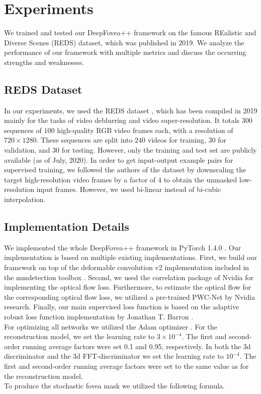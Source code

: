 \documentclass[10pt,twocolumn,letterpaper]{article}
\begin{document}
	\section{Experiments} \label{sec:experiments}
	We trained and tested our DeepFovea++ framework on the famous REalistic and Diverse Scenes (REDS) dataset, which was published in 2019. We analyze the performance of our framework with multiple metrics and discuss the occurring strengths and weaknesses.
	
	\subsection{REDS Dataset} \label{subsec:redsdataset}
	In our experiments, we used the REDS dataset \cite{REDS}, which has been compiled in 2019 mainly for the tasks of video deblurring and video super-resolution. It totals $300$ sequences of $100$ high-quality RGB video frames each, with a resolution of $720\times 1280$. These sequences are split into $240$ videos for training, $30$ for validation, and $30$ for testing. However, only the training and test set are publicly available (as of July, 2020). In order to get input-output example pairs for supervised training, we followed the authors of the dataset by downscaling the target high-resolution video frames by a factor of $4$ to obtain the unmasked low-resolution input frames. However, we used bi-linear instead of bi-cubic interpolation. \cite{REDS}
	
	
	\subsection{Implementation Details} \label{subsec:implementationdetails}
	We implemented the whole DeepFovea++ framework in PyTorch 1.4.0 \cite{pytorch}. Our implementation is based on multiple existing implementations. First, we build our framework on top of the deformable convolution v2 \cite{deformableconv} implementation included in the mmdetection toolbox \cite{mmdetection}. Second, we used the correlation package \cite{flownet2} of Nvidia for implementing the optical flow loss. Furthermore, to estimate the optical flow for the corresponding optical flow loss, we utilized a pre-trained PWC-Net \cite{pwcnet} by Nvidia research. Finally, our main supervised loss function is based on the adaptive robust loss function implementation by Jonathan T. Barron \cite{adaptiveroubustloss}.\\
	
	For optimizing all networks we utilized the Adam optimizer \cite{adam}. For the reconstruction model, we set the learning rate to $3\times 10^{-4}$. The first and second-order running average factors were set 0.1 and 0.95, respectively. In both the 3d discriminator and the 3d FFT-discriminator we set the learning rate to $10^{-4}$. The first and second-order running average factors were set to the same value as for the reconstruction model.\\
	To produce the stochastic fovea mask we utilized the following formula.
	
\end{document}
